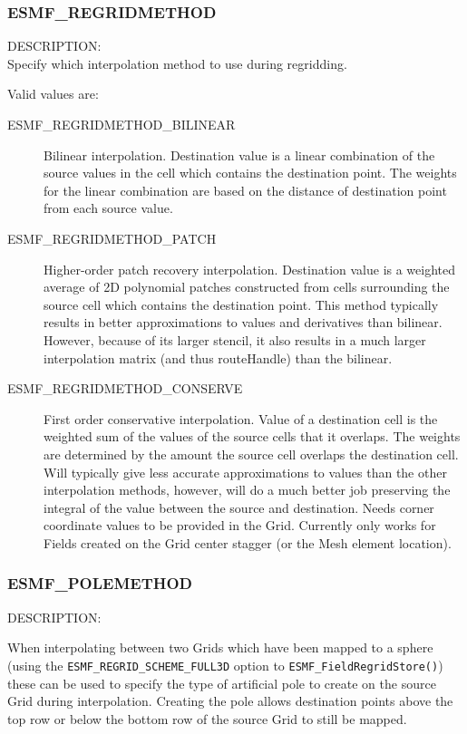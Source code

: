 


\subsubsection{ESMF\_REGRIDMETHOD}
\label{opt:regridmethod}
{\sf DESCRIPTION:\\}  
Specify which interpolation method to use during regridding. 

Valid values are:
\begin{description}
\item [ESMF\_REGRIDMETHOD\_BILINEAR]
      Bilinear interpolation. Destination value is a linear combination of the source values in the cell which contains the destination point. The weights for the linear combination are based on the distance of destination point from each source value. 
\item [ESMF\_REGRIDMETHOD\_PATCH]
      Higher-order patch recovery interpolation. Destination value is a weighted average of 2D polynomial patches constructed from cells surrounding the source cell which contains the destination point. This method typically results in better approximations to values and derivatives than bilinear. However, because of its larger stencil, it also results in a much larger interpolation matrix (and thus routeHandle) than the bilinear. 
\item [ESMF\_REGRIDMETHOD\_CONSERVE]
      First order conservative interpolation. Value of a destination cell is the weighted sum of the values of the source cells that it overlaps. The weights are determined by the amount the source cell overlaps the destination cell. Will typically give less accurate approximations to values than the other interpolation methods, however, will do a much better job preserving the integral of the value between the source and destination.  Needs corner coordinate values to be provided in the Grid. Currently only works for Fields created on the Grid center stagger (or the Mesh element location). 
\end{description}

\subsubsection{ESMF\_POLEMETHOD}
\label{opt:polemethod}
{\sf DESCRIPTION:\\}  
\begin{sloppypar}
When interpolating between two Grids which have been mapped to a sphere (using the {\tt ESMF\_REGRID\_SCHEME\_FULL3D} option to {\tt ESMF\_FieldRegridStore()}) these can be used to specify the type of artificial pole to create on the source Grid during interpolation. Creating the pole allows destination points above the top row or below the bottom row of the source Grid to still be mapped.
\end{sloppypar}

